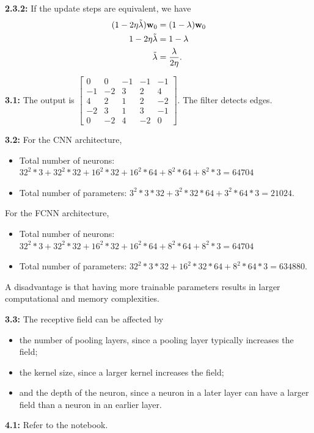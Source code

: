 \documentclass[12pt]{article}
\newcommand{\m}[1]{\mathbf{#1}}
\begin{document}
\textbf{2.3.2:} If the update steps are equivalent, we have \begin{align*}
    (1 - 2\eta\Tilde{\lambda})\m w_0 &= (1-\lambda)\m w_0\\
    1 - 2\eta\Tilde{\lambda} &= 1 - \lambda\\
    \Tilde{\lambda} &= \frac{\lambda}{2\eta}.
\end{align*}

\textbf{3.1:} The output is $\begin{bmatrix} 0 & 0 & -1 & -1 & -1 \\ -1 & -2 & 3 & 2 & 4 \\ 4 & 2 & 1 & 2 & -2 \\ -2 & 3 & 1 & 3 & -1 \\ 0 & -2 & 4 & -2 & 0 \end{bmatrix}$. The filter detects edges.

\textbf{3.2:} For the CNN architecture, \begin{itemize}
    \item Total number of neurons: $32^2*3 + 32^2*32 + 16^2*32 + 16^2*64 + 8^2*64 + 8^2*3 = 64704$
    \item Total number of parameters: $3^2*3*32 + 3^2*32*64 + 3^2*64*3 = 21024$.
\end{itemize} For the FCNN architecture, \begin{itemize}
    \item Total number of neurons: $32^2*3 + 32^2*32 + 16^2*32 + 16^2*64 + 8^2*64 + 8^2*3 = 64704$
    \item Total number of parameters: $32^2*3*32 + 16^2*32*64 + 8^2*64*3 = 634880$.
\end{itemize} A disadvantage is that having more trainable parameters results in larger computational and memory complexities.

\textbf{3.3:} The receptive field can be affected by
\begin{itemize}
    \item the number of pooling layers, since a pooling layer typically increases the field;
    \item the kernel size, since a larger kernel increases the field;
    \item and the depth of the neuron, since a neuron in a later layer can have a larger field than a neuron in an earlier layer.
\end{itemize}

\textbf{4.1:} Refer to the notebook.
\end{document}
